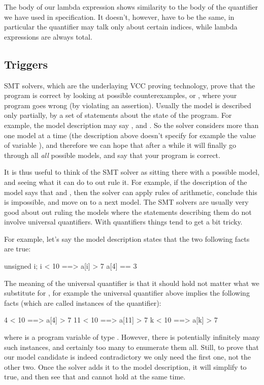 The body of our lambda expression shows similarity to the body
of the quantifier we have used in specification.
It doesn't, however, have to be the same, in particular the quantifier
may talk only about certain indices, while lambda expressions
are always total.

\subsection{Triggers}

SMT solvers, which are the underlaying VCC proving technology,
prove that the program is correct by looking at possible counterexamples,
or , where your program goes wrong (\eg by violating an assertion).
Usually the model is described only partially,
by a set of statements about the state of the program.
For example, the model description may say , 
and .
So the solver considers more than one model at a time (\eg the description
above doesn't specify for example the value of variable ), and therefore
we can hope that after a while it will finally go through all \emph{all}
possible models, and say that your program is correct.

It is thus useful to think of the SMT solver as sitting there with
a possible model, and seeing what it can do to out rule it.
For example, if the description of the model says that  and
, then the solver can apply rules of arithmetic, conclude this is
impossible, and move on to a next model.
The SMT solvers are usually very good about out ruling the models
where the statements describing them do not involve universal quantifiers.
With quantifiers things tend to get a bit tricky.

For example, let's say the model description states that the two
following facts are true:
\begin{VCC}
\forall unsigned i; i < 10 ==> a[i] > 7
a[4] == 3
\end{VCC}
The meaning of the universal quantifier is that it should hold
not matter what we substitute for , for example
the universal quantifier above implies the following facts (which
are called instances of the quantifier):
\begin{VCC}
4 < 10 ==> a[4] > 7
11 < 10 ==> a[11] > 7
k < 10 ==> a[k] > 7
\end{VCC}
where  is a program variable of type .
However, there is potentially infinitely many such instances, and certainly too many
to enumerate them all.
Still, to prove that our model candidate is indeed contradictory
we only need the first one, not the other two.
Once the solver adds it to the model description,
it will simplify  to true,
and then see that  and  cannot hold
at the same time.

